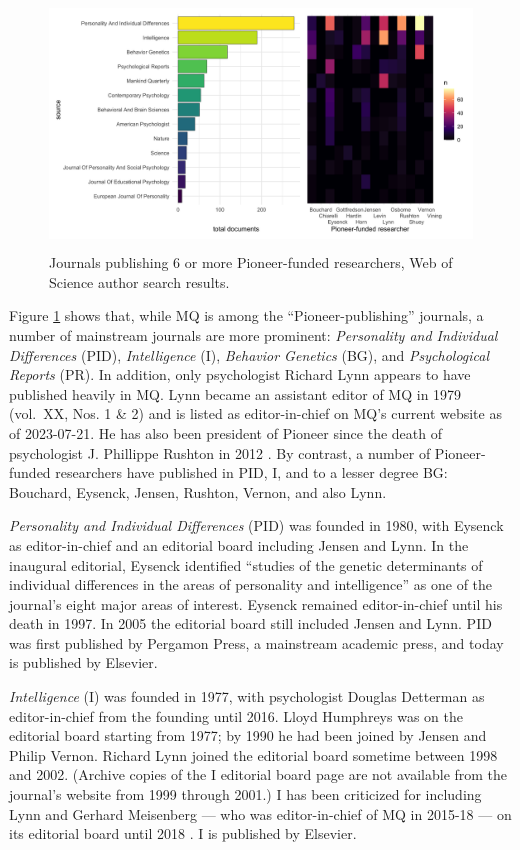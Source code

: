 \documentclass[12pt]{article}
\begin{document}
\begin{figure}
\centering
\includegraphics[width=4.76in,height=2.6in]{img/wos_results.png}
\caption{Journals publishing 6 or more Pioneer-funded researchers, Web of Science author search results. \label{fig:wos}}
\end{figure}

Figure \ref{fig:wos} shows that, while MQ is among the ``Pioneer-publishing'' journals, a number of mainstream journals are more prominent: \emph{Personality and Individual Differences} (PID), \emph{Intelligence} (I), \emph{Behavior Genetics} (BG), and \emph{Psychological Reports} (PR). In addition, only psychologist Richard Lynn appears to have published heavily in MQ. Lynn became an assistant editor of MQ in 1979 (vol.~XX, Nos. 1 \& 2) and is listed as editor-in-chief on MQ's current website as of 2023-07-21. He has also been president of Pioneer since the death of psychologist J. Phillippe Rushton in 2012 \cite{BeirichPioneerFundAssets2013}. By contrast, a number of Pioneer-funded researchers have published in PID, I, and to a lesser degree BG: Bouchard, Eysenck, Jensen, Rushton, Vernon, and also Lynn.

\emph{Personality and Individual Differences} (PID) was founded in 1980, with Eysenck as editor-in-chief and an editorial board including Jensen and Lynn. In the inaugural editorial, Eysenck identified ``studies of the genetic determinants of individual differences in the areas of personality and intelligence'' as one of the journal's eight major areas of interest. Eysenck remained editor-in-chief until his death in 1997. In 2005 the editorial board still included Jensen and Lynn. PID was first published by Pergamon Press, a mainstream academic press, and today is published by Elsevier.

\emph{Intelligence} (I) was founded in 1977, with psychologist Douglas Detterman as editor-in-chief from the founding until 2016. Lloyd Humphreys was on the editorial board starting from 1977; by 1990 he had been joined by Jensen and Philip Vernon. Richard Lynn joined the editorial board sometime between 1998 and 2002. (Archive copies of the I editorial board page are not available from the journal's website from 1999 through 2001.) I has been criticized for including Lynn and Gerhard Meisenberg --- who was editor-in-chief of MQ in 2015-18 --- on its editorial board until 2018 \cite{SainiSuperiorReturnRace2019}. I is published by Elsevier.
\end{document}
